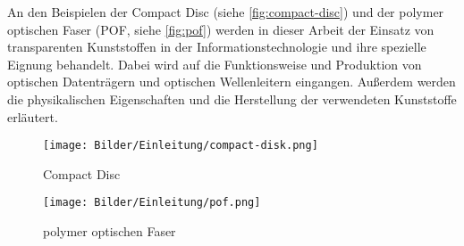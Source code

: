 An den Beispielen der Compact Disc (siehe \autoref{fig:compact-disc}) und der
polymer optischen Faser (POF,  siehe \autoref{fig:pof}) werden in dieser Arbeit
der Einsatz von transparenten Kunststoffen in der Informationstechnologie und
ihre spezielle Eignung behandelt. Dabei wird auf die Funktionsweise und
Produktion von optischen Datenträgern und optischen Wellenleitern eingangen.
Außerdem werden die physikalischen Eigenschaften und die Herstellung der
verwendeten Kunststoffe erläutert.

\begin{figure}[h]
    \begin{center}
        \begin{minipage}[t]{0.3\textwidth}
            \begin{center}
                \texttt{[image: Bilder/Einleitung/compact-disk.png]}
                \caption[Compact Disc \newline \url{https://en.wikipedia.org/wiki/File:Compact_disc.svg}]{Compact Disc}
                \label{fig:compact-disc}
            \end{center}
        \end{minipage}
        \hspace{0.025\textwidth}
        \begin{minipage}[t]{0.3\textwidth}
            \begin{center}
                \texttt{[image: Bilder/Einleitung/pof.png]}
                \caption[polymer optischen Faser \newline \url{http://www.heise.de/tr/imgs/08/2/5/4/2/1/5/c337ef89957e0f2b.jpg}]{polymer optischen Faser}
                \label{fig:pof}
            \end{center}
        \end{minipage}
    \end{center}
\end{figure}
